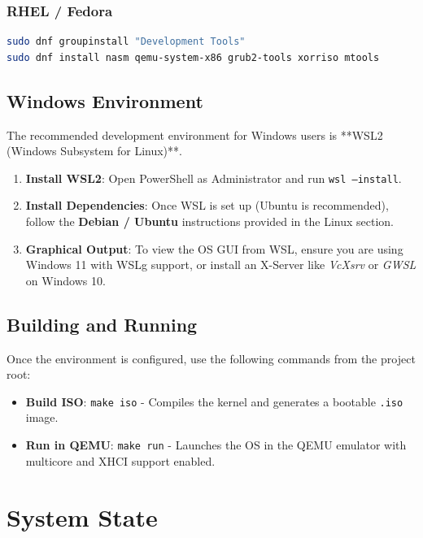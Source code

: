 \documentclass[12pt,a4paper]{report}
\begin{document}
\subsection{RHEL / Fedora}
\begin{lstlisting}[language=bash, basicstyle=\small\ttfamily, backgroundcolor=\color{gray!10}]
sudo dnf groupinstall "Development Tools"
sudo dnf install nasm qemu-system-x86 grub2-tools xorriso mtools
\end{lstlisting}

\section{Windows Environment}
The recommended development environment for Windows users is **WSL2 (Windows Subsystem for Linux)**.

\begin{enumerate}
    \item \textbf{Install WSL2}: Open PowerShell as Administrator and run \texttt{wsl --install}.
    \item \textbf{Install Dependencies}: Once WSL is set up (Ubuntu is recommended), follow the \textbf{Debian / Ubuntu} instructions provided in the Linux section.
    \item \textbf{Graphical Output}: To view the OS GUI from WSL, ensure you are using Windows 11 with WSLg support, or install an X-Server like \textit{VcXsrv} or \textit{GWSL} on Windows 10.
\end{enumerate}

\section{Building and Running}
Once the environment is configured, use the following commands from the project root:
\begin{itemize}
    \item \textbf{Build ISO}: \texttt{make iso} - Compiles the kernel and generates a bootable \texttt{.iso} image.
    \item \textbf{Run in QEMU}: \texttt{make run} - Launches the OS in the QEMU emulator with multicore and XHCI support enabled.
\end{itemize}

\newpage

\chapter{System State}
\end{document}

